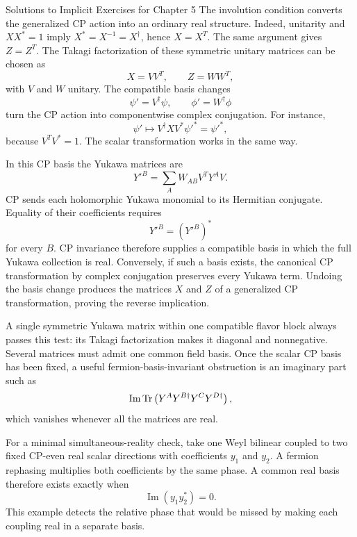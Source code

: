 \begin{bankssolutions}{Solutions to Implicit Exercises for Chapter 5}
The involution condition converts the generalized CP action into an ordinary
real structure.  Indeed, unitarity and $XX^*=1$ imply
$X^*=X^{-1}=X^\dagger$, hence $X=X^T$.  The same argument gives $Z=Z^T$.
The Takagi factorization of these symmetric unitary matrices can be chosen as
\begin{equation*}
  X=VV^T,
  \qquad
  Z=WW^T,
\end{equation*}
with $V$ and $W$ unitary.  The compatible basis changes
\begin{equation*}
  \psi'=V^\dagger\psi,
  \qquad
  \phi'=W^\dagger\phi
\end{equation*}
turn the CP action into componentwise complex conjugation.  For instance,
\begin{equation*}
  \psi'\longmapsto
  V^\dagger X V^*\psi'^*=\psi'^*,
\end{equation*}
because $V^TV^*=1$.  The scalar transformation works in the same way.

In this CP basis the Yukawa matrices are
\begin{equation*}
  Y'^B=\sum_A W_{AB}V^T Y^A V.
\end{equation*}
CP sends each holomorphic Yukawa monomial to its Hermitian conjugate.  Equality
of their coefficients requires
\begin{equation*}
  Y'^B=(Y'^B)^*
\end{equation*}
for every $B$.  CP invariance therefore supplies a compatible basis in which
the full Yukawa collection is real.  Conversely, if such a basis exists, the
canonical CP transformation by complex conjugation preserves every Yukawa
term.  Undoing the basis change produces the matrices $X$ and $Z$ of a
generalized CP transformation, proving the reverse implication.

A single symmetric Yukawa matrix within one compatible flavor block always
passes this test: its Takagi factorization makes it diagonal and nonnegative.
Several matrices must admit one common field basis.  Once the scalar CP basis
has been fixed, a useful fermion-basis-invariant obstruction is an imaginary
part such as
\begin{equation*}
  \operatorname{Im}\operatorname{Tr}\left(
    Y^A Y^{B\dagger}Y^C Y^{D\dagger}
  \right),
\end{equation*}
which vanishes whenever all the matrices are real.

For a minimal simultaneous-reality check, take one Weyl bilinear coupled to
two fixed CP-even real scalar directions with coefficients $y_1$ and $y_2$.
A fermion rephasing multiplies both coefficients by the same phase.  A common
real basis therefore exists exactly when
\begin{equation*}
  \operatorname{Im}(y_1y_2^*)=0.
\end{equation*}
This example detects the relative phase that would be missed by making each
coupling real in a separate basis.


\end{bankssolutions}

